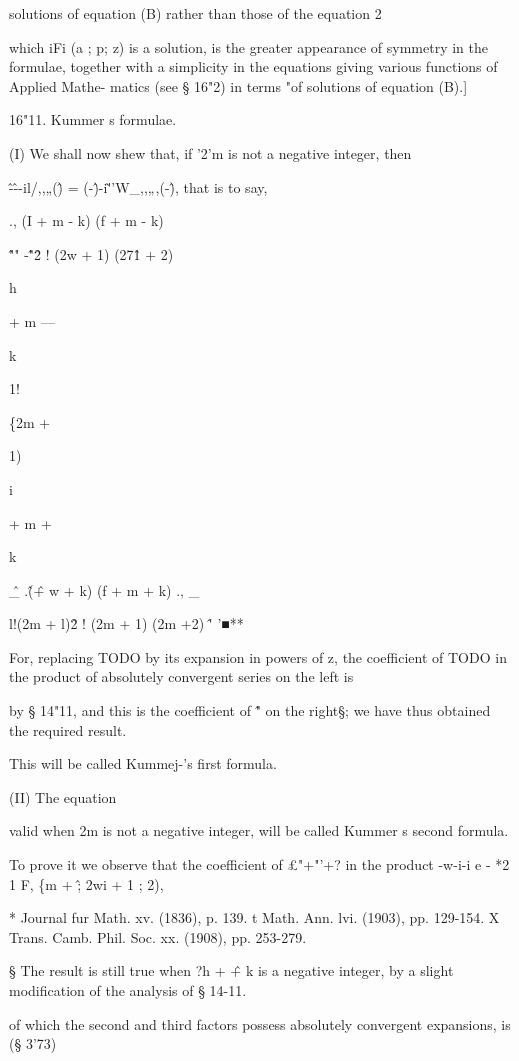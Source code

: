 solutions of equation (B) rather than those of the equation 2

which iFi (a ; p; z) is a solution, is the greater appearance of
symmetry in the formulae, together with a simplicity in the equations
giving various functions of Applied Mathe- matics (see § 16"2) in
terms "of solutions of equation (B).]

16"11. Kummer s formulae.

(I) We shall now shew that, if '2'm is not a negative integer, then

\^-\^--il/,,„(\^) = (-\^)-i\~''W\_,,„,(-\^), that is to say,

., (I + m - k) (f + m - k)

\^ "" -\^"\^ 2 ! (2w + 1) (27\^1 + 2)

h

+ m —

k

1!

\{2m +

1)

i

+ m +

k

\^ \_ .\^ (\^ + w + k) (f + m + k) ., \_

l!(2m + l)\^ 2 ! (2m + 1) (2m +2) \^' '■**

For, replacing TODO by its expansion in powers of z, the coefficient
of TODO in the product of absolutely convergent series on the left is

by § 14"11, and this is the coefficient of \^" on the right§; we have
thus obtained the required result.

This will be called Kummej-'s first formula.

(II) The equation

valid when 2m is not a negative integer, will be called Kummer s
second formula.

To prove it we observe that the coefficient of £"+"'+? in the product
-w-i-i e - *2 1 F, \{m + \^ ; 2wi + 1 ; 2),

* Journal fur Math. xv. (1836), p. 139. t Math. Ann. lvi. (1903), pp.
129-154. X Trans. Camb. Phil. Soc. xx. (1908), pp. 253-279.

§ The result is still true when ?h + \^ + k is a negative integer, by
a slight modification of the analysis of § 14-11.

%
%

of which the second and third factors possess absolutely convergent
expansions, is (§ 3'73)

